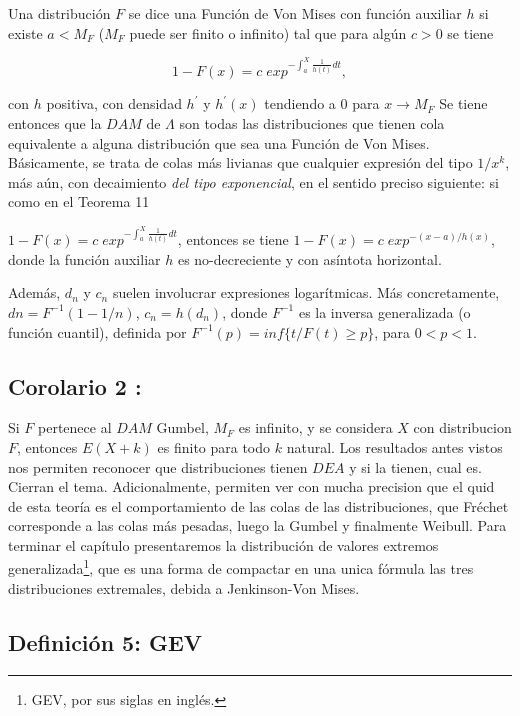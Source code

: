\documentclass[
  oneside]{book}
\begin{document}
Una distribución \(F\) se dice una Función de Von Mises con función
auxiliar \(h\) si existe \(a < M_F\) (\(M_F\) puede ser finito o
infinito) tal que para algún \(c>0\) se tiene

\[
1-F(x)= c\;exp^{{- \int_a^X \frac{1}{h(t)} dt}},
\]

con \(h\) positiva, con densidad \(h^\prime\) y \(h^\prime(x)\)
tendiendo a \(0\) para \(x\rightarrow M_F\) Se tiene entonces que la
\(DAM\) de \(\Lambda\) son todas las distribuciones que tienen cola
equivalente a alguna distribución que sea una Función de Von Mises.
Básicamente, se trata de colas más livianas que cualquier expresión del
tipo \(1/x^k\), más aún, con decaimiento \textit{del tipo exponencial},
en el sentido preciso siguiente: si como en el Teorema 11

\(1-F(x)= c\;exp^{{- \int_a^X \frac{1}{h(t)} dt}}\), entonces se tiene
\(1-F(x)= c\;exp^{-(x-a)/h(x)}\), donde la función auxiliar \(h\) es
no-decreciente y con asíntota horizontal.

Además, \(d_n\) y \(c_n\) suelen involucrar expresiones logarítmicas.
Más concretamente, \(dn = F^{-1}(1-1/n)\), \(c_n = h(d_n)\), donde
\(F^{-1}\) es la inversa generalizada (o función cuantil), definida por
\(F^{-1}(p)= inf\{t / F(t)\geq p\}\), para \(0<p<1\).

\hypertarget{corolario-2}{%
\subsection{Corolario 2 :}\label{corolario-2}}

Si \(F\) pertenece al \(DAM\) Gumbel, \(M_F\) es infinito, y se
considera \(X\) con distribucion \(F\), entonces \(E(X+k)\) es finito
para todo \(k\) natural. Los resultados antes vistos nos permiten
reconocer que distribuciones tienen \(DEA\) y si la tienen, cual es.
Cierran el tema. Adicionalmente, permiten ver con mucha precision que el
quid de esta teoría es el comportamiento de las colas de las
distribuciones, que Fréchet corresponde a las colas más pesadas, luego
la Gumbel y finalmente Weibull. Para terminar el capítulo presentaremos
la distribución de valores extremos
generalizada\footnote{GEV, por sus siglas en inglés.}, que es una forma
de compactar en una unica fórmula las tres distribuciones extremales,
debida a Jenkinson-Von Mises.

\hypertarget{definiciuxf3n-5-gev}{%
\subsection{Definición 5: GEV}\label{definiciuxf3n-5-gev}}
\end{document}
